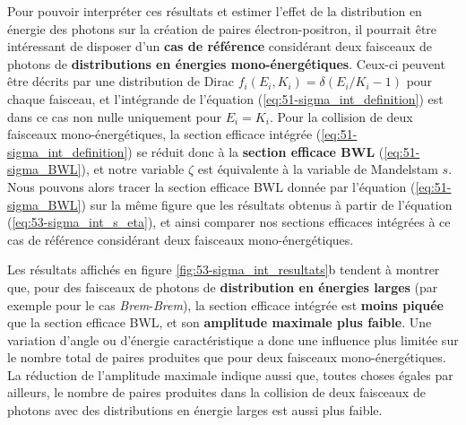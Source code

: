 \begin{refsection}
Pour pouvoir interpréter ces résultats et estimer l'effet de la distribution en énergie des photons sur la création de paires électron-positron, il pourrait être intéressant de disposer d'un \textbf{cas de référence} considérant deux faisceaux de photons de \textbf{distributions en énergies mono-énergétiques}. Ceux-ci peuvent être décrits par une distribution de Dirac $f_i(E_i, K_i) = \delta(E_i/K_i-1)$ pour chaque faisceau, et l'intégrande de l'équation (\ref{eq:51-sigma_int_definition}) est dans ce cas non nulle uniquement pour $E_i=K_i$. Pour la collision de deux faisceaux mono-énergétiques, la section efficace intégrée  (\ref{eq:51-sigma_int_definition}) se réduit donc à la \textbf{section efficace BWL} (\ref{eq:51-sigma_BWL}), et notre variable $\zeta$ est équivalente à la variable de Mandelstam $s$. Nous pouvons alors tracer la section efficace BWL donnée par l'équation (\ref{eq:51-sigma_BWL}) sur la même figure que les résultats obtenus à partir de l'équation (\ref{eq:53-sigma_int_s_eta}), et ainsi comparer nos sections efficaces intégrées à ce cas de référence considérant deux faisceaux mono-énergétiques.


Les résultats affichés en figure \ref{fig:53-sigma_int_resultats}b tendent à montrer que, pour des faisceaux de photons de \textbf{distribution en énergies larges} (par exemple pour le cas \textit{Brem}-\textit{Brem}), la section efficace intégrée est \textbf{moins piquée} que la section efficace BWL, et son \textbf{amplitude maximale plus faible}. Une variation d'angle ou d'énergie caractéristique a donc une influence plus limitée sur le nombre total de paires produites que pour deux faisceaux mono-énergétiques. La réduction de l'amplitude maximale indique aussi que, toutes choses égales par ailleurs, le nombre de paires produites dans la collision de deux faisceaux de photons avec des distributions en énergie larges est aussi plus faible.


\end{refsection}
